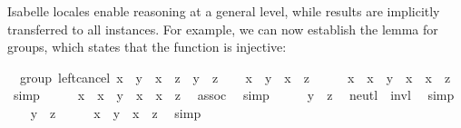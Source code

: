\begin{isabellebody}
\begin{isamarkuptext}
Isabelle locales enable reasoning at a general level, while results
  are implicitly transferred to all instances.  For example, we can
  now establish the  lemma for groups, which
  states that the function  is injective:%
\end{isamarkuptext}%
\isamarkuptrue%
%
\isadelimquote
%
\endisadelimquote
%
\isatagquote
{}\isamarkupfalse%
\ {\isacharparenleft}\ group{\isacharparenright}\ left{\isacharunderscore}cancel{\isacharcolon}\ {\isachardoublequoteopen}x\ {\isasymotimes}\ y\ {\isacharequal}\ x\ {\isasymotimes}\ z\ {\isasymlongleftrightarrow}\ y\ {\isacharequal}\ z{\isachardoublequoteclose}\isanewline
{}\isamarkupfalse%
\isanewline
\ \ \isamarkupfalse%
\ {\isachardoublequoteopen}x\ {\isasymotimes}\ y\ {\isacharequal}\ x\ {\isasymotimes}\ z{\isachardoublequoteclose}\isanewline
\ \ \isamarkupfalse%
\ \isamarkupfalse%
\ {\isachardoublequoteopen}x{\isasymdiv}\ {\isasymotimes}\ {\isacharparenleft}x\ {\isasymotimes}\ y{\isacharparenright}\ {\isacharequal}\ x{\isasymdiv}\ {\isasymotimes}\ {\isacharparenleft}x\ {\isasymotimes}\ z{\isacharparenright}{\isachardoublequoteclose}\ \isamarkupfalse%
\ simp\isanewline
\ \ \isamarkupfalse%
\ \isamarkupfalse%
\ {\isachardoublequoteopen}{\isacharparenleft}x{\isasymdiv}\ {\isasymotimes}\ x{\isacharparenright}\ {\isasymotimes}\ y\ {\isacharequal}\ {\isacharparenleft}x{\isasymdiv}\ {\isasymotimes}\ x{\isacharparenright}\ {\isasymotimes}\ z{\isachardoublequoteclose}\ \isamarkupfalse%
\ assoc\ \isamarkupfalse%
\ simp\isanewline
\ \ \isamarkupfalse%
\ \isamarkupfalse%
\ {\isachardoublequoteopen}y\ {\isacharequal}\ z{\isachardoublequoteclose}\ \isamarkupfalse%
\ neutl\ \ invl\ \isamarkupfalse%
\ simp\isanewline
{}\isamarkupfalse%
\isanewline
\ \ \isamarkupfalse%
\ {\isachardoublequoteopen}y\ {\isacharequal}\ z{\isachardoublequoteclose}\isanewline
\ \ \isamarkupfalse%
\ \isamarkupfalse%
\ {\isachardoublequoteopen}x\ {\isasymotimes}\ y\ {\isacharequal}\ x\ {\isasymotimes}\ z{\isachardoublequoteclose}\ \isamarkupfalse%
\ simp\isanewline
{}\isamarkupfalse%
%
\endisatagquote
{\isafoldquote}%
%
\isadelimquote
%
\endisadelimquote
%
\begin{isamarkuptext}%

\end{isamarkuptext}
\end{isabellebody}
